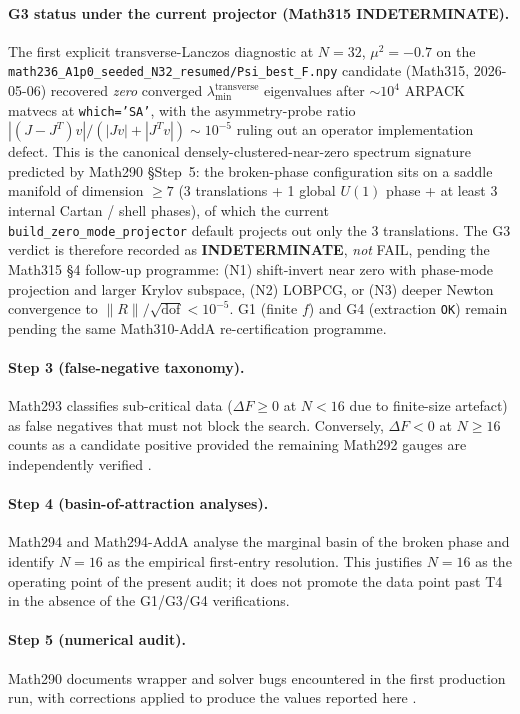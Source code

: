 \paragraph{G3 status under the current projector (Math315
INDETERMINATE).} The first explicit transverse-Lanczos diagnostic at
$N=32$, $\mu^2=-0.7$ on the
\texttt{math236\_A1p0\_seeded\_N32\_resumed/Psi\_best\_F.npy}
candidate (Math315, 2026-05-06) recovered \emph{zero} converged
$\lambda_{\min}^{\mathrm{transverse}}$ eigenvalues after
$\sim 10^{4}$ ARPACK matvecs at \texttt{which='SA'}, with the
asymmetry-probe ratio $|(J - J^T)v|/(|Jv| + |J^Tv|) \sim 10^{-5}$
ruling out an operator implementation defect. This is the canonical
densely-clustered-near-zero spectrum signature predicted by Math290
\S Step~5: the broken-phase configuration sits on a saddle manifold
of dimension $\geq 7$ (3 translations + 1 global $U(1)$ phase + at
least $3$ internal Cartan / shell phases), of which the current
\texttt{build\_zero\_mode\_projector} default projects out only the
$3$ translations. The G3 verdict is therefore recorded as
\textbf{INDETERMINATE}, \emph{not} FAIL, pending the Math315 \S 4
follow-up programme: (N1) shift-invert near zero with phase-mode
projection and larger Krylov subspace, (N2) LOBPCG, or
(N3) deeper Newton convergence to
$\|R\|/\sqrt{\mathrm{dof}} < 10^{-5}$. G1 (finite $f$) and G4
(extraction \texttt{OK}) remain pending the same Math310-AddA
re-certification programme.

\paragraph{Step 3 (false-negative taxonomy).}
Math293 classifies sub-critical data ($\Delta F\geq 0$ at $N<16$ due
to finite-size artefact) as false negatives that must not block the
search. Conversely, $\Delta F<0$ at $N\geq 16$ counts as a candidate
positive provided the remaining Math292 gauges are independently
verified \cite{Math293}.

\paragraph{Step 4 (basin-of-attraction analyses).}
Math294 and Math294-AddA analyse the marginal basin of the broken
phase and identify $N=16$ as the empirical first-entry resolution.
This justifies $N=16$ as the operating point of the present audit; it
does not promote the data point past T4 in the absence of the G1/G3/G4
verifications.

\paragraph{Step 5 (numerical audit).}
Math290 documents wrapper and solver bugs encountered in the first
production run, with corrections applied to produce the values
reported here \cite{Math290}.


